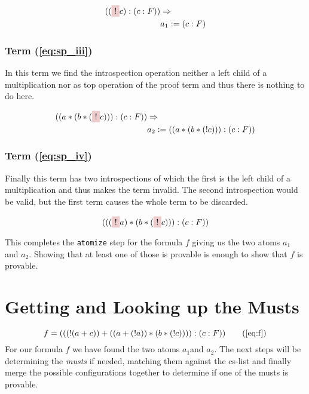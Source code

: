 \begin{equation}\label{eq:a_1}
	\begin{split}
	((\tikz[baseline]{\node[fill=red!20,anchor=base] (t1){$!$};} c):(c:F)) & \Rightarrow \\
	& a_1 := (c:F)
	\end{split}
\end{equation}

\subsubsection[Third term]{Term (\ref{eq:sp_iii})}
In this term we find the introspection operation neither a left child of a multiplication nor as top operation of the proof term and thus there is nothing to do here.

\begin{equation}\label{eq:a_2}
	\begin{split}
	((a *(b* (\tikz[baseline]{\node[fill=red!20,anchor=base] (t1){$!$};} c))):(c:F))	 & \Rightarrow \\
	& a_2 := ((a *(b* (! c))):(c:F))
	\end{split}
\end{equation}

\subsubsection[Fourths term]{Term (\ref{eq:sp_iv})}
Finally this term has two introspections of which the first is the left child of a multiplication and thus makes the term invalid. The second introspection would be valid, but the first term causes the whole term to be discarded.

\begin{equation*}
	(((
	\tikz[baseline]{\node[fill=red!20,anchor=base] (t1){$!$};} a)*(b* (
	\tikz[baseline]{\node[fill=red!20,anchor=base] (t1){$!$};} c))):(c:F))
\end{equation*}

\bigskip
This completes the \texttt{atomize} step for the formula $f$ giving us the two atoms $a_1$ and $a_2$. Showing that at least one of those is provable is enough to show that $f$ is provable. 

\section{Getting and Looking up the Musts}

\begin{equation*}
		f = (((!(a+c))+((a+(!a))*(b*(!c)))):(c:F)) 
		\tag{\ref{eq:f}}  
\end{equation*}
For our formula $f$ we have found the two atoms $a_1$and $a_2$. The next steps will be determining the \emph{musts} if needed, matching them against the cs-list and finally merge the possible configurations together to determine if one of the musts is provable.


